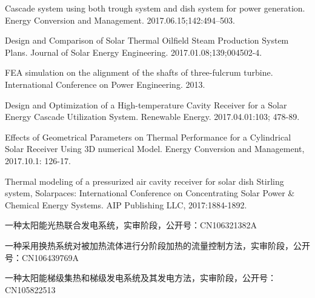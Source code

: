 \begin{publications}
  \item Cascade system using both trough system and dish system for power generation. Energy Conversion and Management. 2017.06.15;142:494–503.
  \item Design and Comparison of Solar Thermal Oilfield Steam Production System Plans. Journal of Solar Energy Engineering. 2017.01.08;139;004502-4.
  \item FEA simulation on the alignment of the shafts of three-fulcrum turbine. International Conference on Power Engineering. 2013.
  \item Design and Optimization of a High-temperature Cavity Receiver for a Solar Energy Cascade Utilization System. Renewable Energy. 2017.04.01:103; 478-89. 
  \item Effects of Geometrical Parameters on Thermal Performance for a Cylindrical Solar Receiver Using 3D numerical Model. Energy Conversion and Management, 2017.10.1: 126-17.
  \item Thermal modeling of a pressurized air cavity receiver for solar dish Stirling system, Solarpaces: International Conference on Concentrating Solar Power \& Chemical Energy Systems. AIP Publishing LLC, 2017:1884-1892.
  
  \item 一种太阳能光热联合发电系统，实审阶段，公开号：CN106321382A
  \item 一种采用换热系统对被加热流体进行分阶段加热的流量控制方法，实审阶段，公开号：CN106439769A
  \item 一种太阳能梯级集热和梯级发电系统及其发电方法，实审阶段，公开号：CN105822513
  
\end{publications}